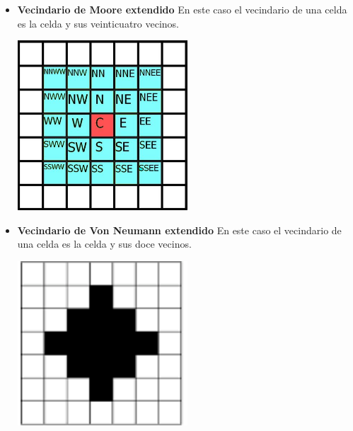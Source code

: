\begin{itemize}
\begin{minipage}
            \end{minipage}
        \item
            \begin{minipage}
                {0.5\textwidth}
                \textbf{Vecindario de Moore extendido} En este caso el vecindario de una celda es la celda y sus veinticuatro vecinos.
            \end{minipage}
            \begin{minipage}
                {0.5\textwidth}
                \centering
                \includegraphics[width=0.5\textwidth]{./images/marco_teorico/automatas_celulares/mooreNeX.jpg}
            \end{minipage}
        \item 
            \begin{minipage}
                {0.5\textwidth}
                \textbf{Vecindario de Von Neumann extendido} En este caso el vecindario de una celda es la celda y sus doce vecinos.
            \end{minipage}
            \begin{minipage}
                {0.5\textwidth}
                \centering
                \includegraphics[width=0.5\textwidth]{./images/marco_teorico/automatas_celulares/vonNeX.png}

\end{minipage}
\end{itemize}

